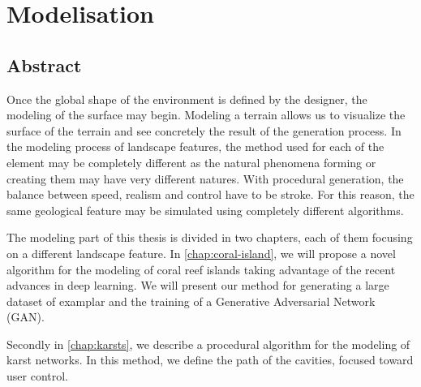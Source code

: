 \part{Modelisation}

\chapter*{Abstract}
\label{chap:modelisation-abstract}

Once the global shape of the environment is defined by the designer, the modeling of the surface may begin. Modeling a terrain allows us to visualize the surface of the terrain and see concretely the result of the generation process. In the modeling process of landscape features, the method used for each of the element may be completely different as the natural phenomena forming or creating them may have very different natures. With procedural generation, the balance between speed, realism and control have to be stroke. For this reason, the same geological feature may be simulated using completely different algorithms.

The modeling part of this thesis is divided in two chapters, each of them focusing on a different landscape feature. In \cref{chap:coral-island}, we will propose a novel algorithm for the modeling of coral reef islands taking advantage of the recent advances in deep learning. We will present our method for generating a large dataset of examplar and the training of a Generative Adversarial Network (GAN).

Secondly in \cref{chap:karsts}, we describe a procedural algorithm for the modeling of karst networks. In this method, we define the path of the cavities, focused toward user control.



